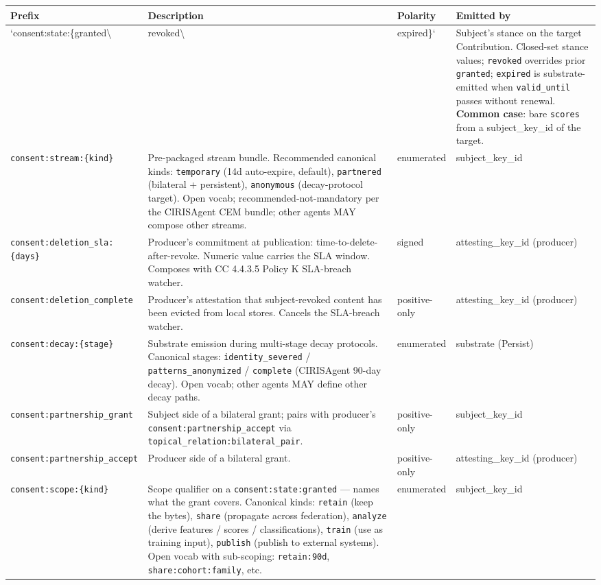 \documentclass[11pt]{article}
\begin{document}
{\scriptsize
\begin{longtable}{|p{4.0cm}|p{4.0cm}|p{4.0cm}|p{4.0cm}|}\hline
\textbf{Prefix} & \textbf{Description} & \textbf{Polarity} & \textbf{Emitted by} \\ \hline\endhead
`consent:state:\{granted\textbackslash{} & revoked\textbackslash{} & expired\}` & Subject's stance on the target Contribution. Closed-set stance values; \texttt{revoked} overrides prior \texttt{granted}; \texttt{expired} is substrate-emitted when \texttt{valid\_until} passes without renewal. \textbf{Common case}: bare \texttt{scores} from a subject\_key\_id of the target. \\ \hline
\texttt{consent:stream:\{kind\}} & Pre-packaged stream bundle. Recommended canonical kinds: \texttt{temporary} (14d auto-expire, default), \texttt{partnered} (bilateral + persistent), \texttt{anonymous} (decay-protocol target). Open vocab; recommended-not-mandatory per the CIRISAgent CEM bundle; other agents MAY compose other streams. & enumerated & subject\_key\_id \\ \hline
\texttt{consent:deletion\_sla:\{days\}} & Producer's commitment at publication: time-to-delete-after-revoke. Numeric value carries the SLA window. Composes with CC 4.4.3.5 Policy K SLA-breach watcher. & signed & attesting\_key\_id (producer) \\ \hline
\texttt{consent:deletion\_complete} & Producer's attestation that subject-revoked content has been evicted from local stores. Cancels the SLA-breach watcher. & positive-only & attesting\_key\_id (producer) \\ \hline
\texttt{consent:decay:\{stage\}} & Substrate emission during multi-stage decay protocols. Canonical stages: \texttt{identity\_severed} / \texttt{patterns\_anonymized} / \texttt{complete} (CIRISAgent 90-day decay). Open vocab; other agents MAY define other decay paths. & enumerated & substrate (Persist) \\ \hline
\texttt{consent:partnership\_grant} & Subject side of a bilateral grant; pairs with producer's \texttt{consent:partnership\_accept} via \texttt{topical\_relation:bilateral\_pair}. & positive-only & subject\_key\_id \\ \hline
\texttt{consent:partnership\_accept} & Producer side of a bilateral grant. & positive-only & attesting\_key\_id (producer) \\ \hline
\texttt{consent:scope:\{kind\}} & Scope qualifier on a \texttt{consent:state:granted} — names what the grant covers. Canonical kinds: \texttt{retain} (keep the bytes), \texttt{share} (propagate across federation), \texttt{analyze} (derive features / scores / classifications), \texttt{train} (use as training input), \texttt{publish} (publish to external systems). Open vocab with sub-scoping: \texttt{retain:90d}, \texttt{share:cohort:family}, etc. & enumerated & subject\_key\_id \\ \hline

\end{longtable}}
\end{document}
